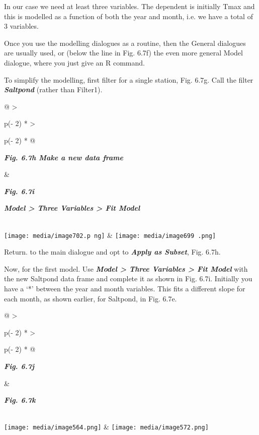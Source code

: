 \documentclass[
  letterpaper,
  DIV=11,
  numbers=noendperiod]{scrreprt}
\begin{document}
In our case we need at least three variables. The dependent is initially
Tmax and this is modelled as a function of both the year and month, i.e.
we have a total of 3 variables.

Once you use the modelling dialogues as a routine, then the General
dialogues are usually used, or (below the line in Fig. 6.7f) the even
more general Model dialogue, where you just give an R command.

To simplify the modelling, first filter for a single station, Fig. 6.7g.
Call the filter \textbf{\emph{Saltpond}} (rather than Filter1).

\begin{longtable}[]{@{}
  >{\raggedright\arraybackslash}p{(\columnwidth - 2\tabcolsep) * }
  >{\raggedright\arraybackslash}p{(\columnwidth - 2\tabcolsep) * }@{}}
\toprule\noalign{}
\begin{minipage}[b]{\linewidth}\raggedright
\textbf{\emph{Fig. 6.7h Make a new data frame}}
\end{minipage} & \begin{minipage}[b]{\linewidth}\raggedright
\textbf{\emph{Fig. 6.7i}}

\textbf{\emph{Model \textgreater{} Three Variables \textgreater{} Fit
Model}}
\end{minipage} \\
\midrule\noalign{}
\endhead
\bottomrule\noalign{}
\endlastfoot
\texttt{[image: media/image702.p ng]}
&
\texttt{[image: media/image699 .png]} \\
\end{longtable}

Return. to the main dialogue and opt to \textbf{\emph{Apply as Subset}},
Fig. 6.7h.

Now, for the first model. Use \textbf{\emph{Model \textgreater{} Three
Variables \textgreater{} Fit Model}} with the new Saltpond data frame
and complete it as shown in Fig. 6.7i. Initially you have a `*' between
the year and month variables. This fits a different slope for each
month, as shown earlier, for Saltpond, in Fig. 6.7e.

\begin{longtable}[]{@{}
  >{\raggedright\arraybackslash}p{(\columnwidth - 2\tabcolsep) * }
  >{\raggedright\arraybackslash}p{(\columnwidth - 2\tabcolsep) * }@{}}
\toprule\noalign{}
\begin{minipage}[b]{\linewidth}\raggedright
\textbf{\emph{Fig. 6.7j}}
\end{minipage} & \begin{minipage}[b]{\linewidth}\raggedright
\textbf{\emph{Fig. 6.7k}}
\end{minipage} \\
\midrule\noalign{}
\endhead
\bottomrule\noalign{}
\endlastfoot
\texttt{[image: media/image564.png]} &
\texttt{[image: media/image572.png]} \\
\end{longtable}
\end{document}
